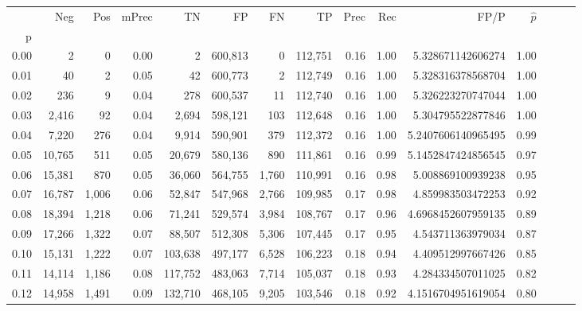 \begin{tabular}{rrrrrrrrrrrrrrr}
\toprule
{} &     Neg &    Pos & mPrec &       TN &       FP &       FN &       TP &  Prec &   Rec &                    FP/P & $\hat{p}$ \\
p    &         &        &       &          &          &          &          &       &       &                         &           \\
\midrule
0.00 &       2 &      0 &  0.00 &        2 &  600,813 &        0 &  112,751 &  0.16 &  1.00 &       5.328671142606274 &      1.00 \\
0.01 &      40 &      2 &  0.05 &       42 &  600,773 &        2 &  112,749 &  0.16 &  1.00 &       5.328316378568704 &      1.00 \\
0.02 &     236 &      9 &  0.04 &      278 &  600,537 &       11 &  112,740 &  0.16 &  1.00 &       5.326223270747044 &      1.00 \\
0.03 &   2,416 &     92 &  0.04 &    2,694 &  598,121 &      103 &  112,648 &  0.16 &  1.00 &       5.304795522877846 &      1.00 \\
0.04 &   7,220 &    276 &  0.04 &    9,914 &  590,901 &      379 &  112,372 &  0.16 &  1.00 &      5.2407606140965495 &      0.99 \\
0.05 &  10,765 &    511 &  0.05 &   20,679 &  580,136 &      890 &  111,861 &  0.16 &  0.99 &      5.1452847424856545 &      0.97 \\
0.06 &  15,381 &    870 &  0.05 &   36,060 &  564,755 &    1,760 &  110,991 &  0.16 &  0.98 &       5.008869100939238 &      0.95 \\
0.07 &  16,787 &  1,006 &  0.06 &   52,847 &  547,968 &    2,766 &  109,985 &  0.17 &  0.98 &       4.859983503472253 &      0.92 \\
0.08 &  18,394 &  1,218 &  0.06 &   71,241 &  529,574 &    3,984 &  108,767 &  0.17 &  0.96 &      4.6968452607959135 &      0.89 \\
0.09 &  17,266 &  1,322 &  0.07 &   88,507 &  512,308 &    5,306 &  107,445 &  0.17 &  0.95 &       4.543711363979034 &      0.87 \\
0.10 &  15,131 &  1,222 &  0.07 &  103,638 &  497,177 &    6,528 &  106,223 &  0.18 &  0.94 &       4.409512997667426 &      0.85 \\
0.11 &  14,114 &  1,186 &  0.08 &  117,752 &  483,063 &    7,714 &  105,037 &  0.18 &  0.93 &       4.284334507011025 &      0.82 \\
0.12 &  14,958 &  1,491 &  0.09 &  132,710 &  468,105 &    9,205 &  103,546 &  0.18 &  0.92 &      4.1516704951619054 &      0.80 \\

\end{tabular}

